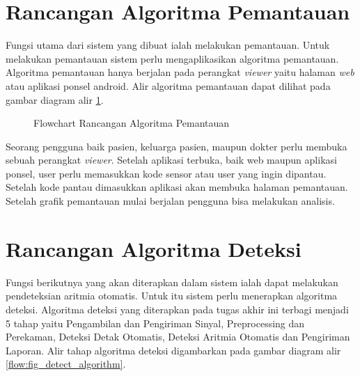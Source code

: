 \section{Rancangan Algoritma Pemantauan} \label{ssec:algorithm_design_1}
Fungsi utama dari sistem yang dibuat ialah melakukan pemantauan. Untuk melakukan pemantauan sistem perlu mengaplikasikan algoritma pemantauan. Algoritma pemantauan hanya berjalan pada perangkat \textit{viewer} yaitu halaman \textit{web} atau aplikasi ponsel android. Alir algoritma pemantauan dapat dilihat pada gambar diagram alir \ref{flow:fig_report_algorithm}.
\begin{figure}[H]
	\centering
    \caption{Flowchart Rancangan Algoritma Pemantauan}
	\label{flow:fig_report_algorithm}
\end{figure}

Seorang pengguna baik pasien, keluarga pasien, maupun dokter perlu membuka sebuah perangkat \textit{viewer}. Setelah aplikasi terbuka, baik web maupun aplikasi ponsel, user perlu memasukkan kode sensor atau user yang ingin dipantau. Setelah kode pantau dimasukkan aplikasi akan membuka halaman pemantauan. Setelah grafik pemantauan mulai berjalan pengguna bisa melakukan analisis.

\section{Rancangan Algoritma Deteksi} \label{ssec:algorithm_design_2}
Fungsi berikutnya yang akan diterapkan dalam sistem ialah dapat melakukan pendeteksian aritmia otomatis. Untuk itu sistem perlu menerapkan algoritma deteksi. Algoritma deteksi yang diterapkan pada tugas akhir ini terbagi menjadi 5 tahap yaitu Pengambilan dan Pengiriman Sinyal, Preprocessing dan Perekaman, Deteksi Detak Otomatis, Deteksi Aritmia Otomatis dan Pengiriman Laporan. Alir tahap algoritma deteksi digambarkan pada gambar diagram alir \ref{flow:fig_detect_algorithm}.

